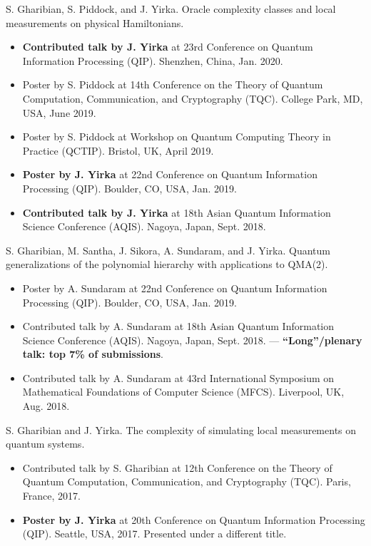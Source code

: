 \documentclass[11pt,letterpaper,serif]{moderncv}
\newcommand{\pubItemSep}{0.3em}
\begin{document}
S. Gharibian, S. Piddock, and J. Yirka. Oracle complexity classes and local measurements on physical Hamiltonians.
\begin{adjustwidth}{.25in}{}
	\begin{itemize}[itemsep=\pubItemSep]
		\item \textbf{Contributed talk by J. Yirka} at 23rd Conference on Quantum Information Processing (QIP). Shenzhen, China, Jan. 2020.
		\item Poster by S. Piddock at 14th Conference on the Theory of Quantum Computation, Communication, and Cryptography (TQC). College Park, MD, USA, June 2019.
		\item Poster by S. Piddock at Workshop on Quantum Computing Theory in Practice (QCTIP). Bristol, UK, April 2019.
		\item \textbf{Poster by J. Yirka} at 22nd Conference on Quantum Information Processing (QIP). Boulder, CO, USA, Jan. 2019.
		\item \textbf{Contributed talk by J. Yirka} at 18th Asian Quantum Information Science Conference (AQIS). Nagoya, Japan, Sept. 2018.
	\end{itemize}
\end{adjustwidth}

S. Gharibian, M. Santha, J. Sikora, A. Sundaram, and J. Yirka. Quantum generalizations of the polynomial hierarchy with applications to QMA(2).
\begin{adjustwidth}{.25in}{} 
	\begin{itemize}[itemsep=\pubItemSep]
		\item Poster by A. Sundaram at 22nd Conference on Quantum Information Processing (QIP). Boulder, CO, USA, Jan. 2019.
		\item Contributed talk by A. Sundaram at 18th Asian Quantum Information Science Conference (AQIS). Nagoya, Japan, Sept. 2018. --- \textbf{``Long''/plenary talk: top 7\% of submissions}.
		\item Contributed talk by A. Sundaram at 43rd International	Symposium on Mathematical Foundations of Computer Science (MFCS). Liverpool, UK, Aug. 2018.
	\end{itemize}
\end{adjustwidth}

S. Gharibian and J. Yirka. The complexity of simulating local measurements on quantum systems.
\begin{adjustwidth}{.25in}{}
	\begin{itemize}[itemsep=\pubItemSep]
		\item Contributed talk by S. Gharibian at 12th Conference on the Theory of Quantum Computation, Communication,
		and Cryptography (TQC). Paris, France, 2017.
		\item \textbf{Poster by J. Yirka} at 20th Conference on Quantum Information Processing (QIP). Seattle, USA, 2017. Presented under a different title.
	\end{itemize}
\end{adjustwidth}
\end{document}
